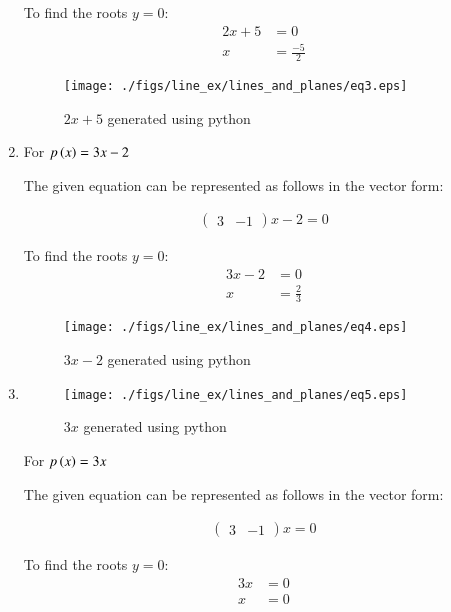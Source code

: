 \begin{enumerate}
To find the roots $y=0$:
\begin{align}
2x + 5 &= 0 \\
x &= \frac{-5}{2}
\end{align}
\begin{figure}[!ht]
\centering
\texttt{[image: ./figs/line\_ex/lines\_and\_planes/eq3.eps]}
\caption{$2x + 5$ generated using python}
\label{fig:eq3_lines_and_planes}
\end{figure} 
\item \solution For $p\left(x\right) = 3x - 2$
\begin{flushleft}
The given equation can be represented as follows in the vector form:
\end{flushleft}
\begin{align}
\begin{pmatrix}
3 & -1 
\end{pmatrix}
x - 2 = 0
\end{align}

To find the roots $y=0$:
\begin{align}
3x - 2 &= 0 \\
x &= \frac{2}{3}
\end{align}
\begin{figure}[!ht]
\centering
\texttt{[image: ./figs/line\_ex/lines\_and\_planes/eq4.eps]}
\caption{$3x - 2$ generated using python}
\label{fig:eq4_lines_and_planes}
\end{figure} 
\item 
\begin{figure}[!ht] 
\centering
\texttt{[image: ./figs/line\_ex/lines\_and\_planes/eq5.eps]}
\caption{$3x$ generated using python}
\label{fig:eq5_lines_and_planes}
\end{figure} 
\solution For $p\left(x\right) = 3x$
\begin{flushleft}
The given equation can be represented as follows in the vector form:
\end{flushleft}
\begin{align}
\begin{pmatrix}
3 & -1 
\end{pmatrix}
x  = 0
\end{align}

To find the roots $y=0$:
\begin{align}
3x  &= 0 \\
x &= 0
\end{align}

\end{enumerate}
